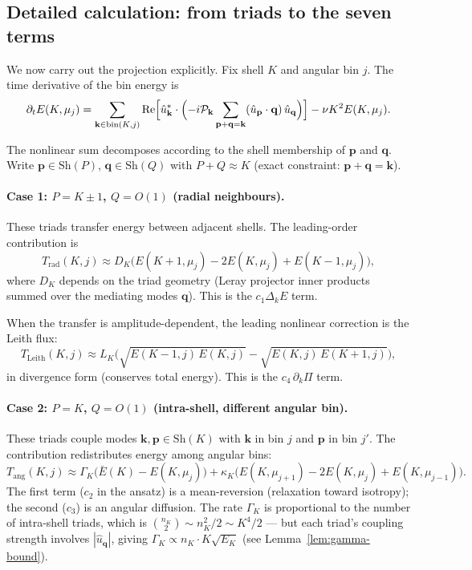 \documentclass[11pt,a4paper]{article}
\theoremstyle{remark}
\begin{document}
\subsection{Detailed calculation: from triads to the seven terms}\label{sec:detailed-calc}

We now carry out the projection explicitly.  Fix shell $K$ and angular bin $j$.  The time derivative of the bin energy is
\[
  \partial_t E(K, \mu_j) = \sum_{\mathbf{k} \in \mathrm{bin}(K,j)} \mathrm{Re}\Bigl[\hat{u}_{\mathbf{k}}^* \cdot \Bigl(-i\mathcal{P}_{\mathbf{k}} \sum_{\mathbf{p}+\mathbf{q}=\mathbf{k}} (\hat{u}_{\mathbf{p}} \cdot \mathbf{q})\,\hat{u}_{\mathbf{q}}\Bigr)\Bigr] - \nu K^2 E(K, \mu_j).
\]

The nonlinear sum decomposes according to the shell membership of $\mathbf{p}$ and $\mathbf{q}$.  Write $\mathbf{p} \in \mathrm{Sh}(P)$, $\mathbf{q} \in \mathrm{Sh}(Q)$ with $P + Q \approx K$ (exact constraint: $\mathbf{p} + \mathbf{q} = \mathbf{k}$).

\paragraph{Case 1: $P = K \pm 1$, $Q = O(1)$ (radial neighbours).}
These triads transfer energy between adjacent shells.  The leading-order contribution is
\[
  T_{\mathrm{rad}}(K, j) \approx D_K \bigl(E(K+1, \mu_j) - 2E(K, \mu_j) + E(K-1, \mu_j)\bigr),
\]
where $D_K$ depends on the triad geometry (Leray projector inner products summed over the mediating modes $\mathbf{q}$).  This is the $c_1 \Delta_k E$ term.

When the transfer is amplitude-dependent, the leading nonlinear correction is the Leith flux:
\[
  T_{\mathrm{Leith}}(K, j) \approx L_K \bigl(\sqrt{E(K-1,j)\,E(K,j)} - \sqrt{E(K,j)\,E(K+1,j)}\bigr),
\]
in divergence form (conserves total energy).  This is the $c_4\,\partial_k \Pi$ term.

\paragraph{Case 2: $P = K$, $Q = O(1)$ (intra-shell, different angular bin).}
These triads couple modes $\mathbf{k}, \mathbf{p} \in \mathrm{Sh}(K)$ with $\mathbf{k}$ in bin $j$ and $\mathbf{p}$ in bin $j'$.  The contribution redistributes energy among angular bins:
\[
  T_{\mathrm{ang}}(K, j) \approx \Gamma_K \bigl(\bar{E}(K) - E(K, \mu_j)\bigr) + \kappa_K \bigl(E(K, \mu_{j+1}) - 2E(K, \mu_j) + E(K, \mu_{j-1})\bigr).
\]
The first term ($c_2$ in the ansatz) is a mean-reversion (relaxation toward isotropy); the second ($c_3$) is an angular diffusion.  The rate $\Gamma_K$ is proportional to the number of intra-shell triads, which is $\binom{n_K}{2} \sim n_K^2/2 \sim K^4/2$ --- but each triad's coupling strength involves $|\hat{u}_{\mathbf{q}}|$, giving $\Gamma_K \propto n_K \cdot K\sqrt{E_K}$ (see Lemma~\ref{lem:gamma-bound}).
\end{document}
